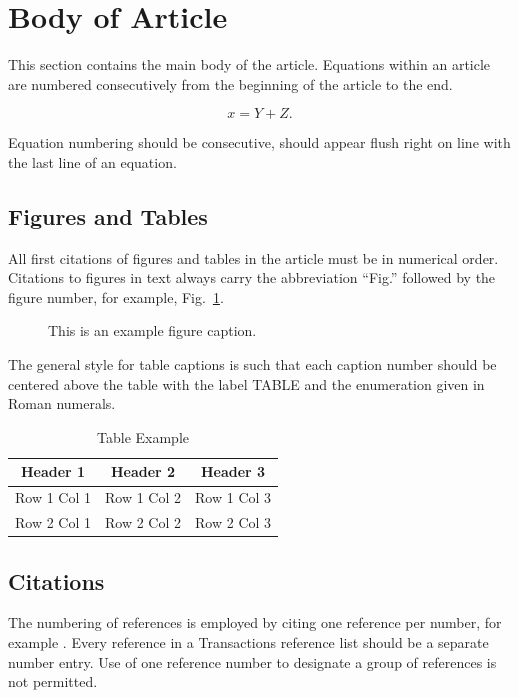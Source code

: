 \section{Body of Article}

This section contains the main body of the article. Equations within an article are numbered consecutively from the beginning of the article to the end.

\begin{equation}
    x = Y + Z. \label{eq:sample}
\end{equation}

Equation numbering should be consecutive, should appear flush right on line with the last line of an equation. 

\subsection{Figures and Tables}

All first citations of figures and tables in the article must be in numerical order. Citations to figures in text always carry the abbreviation ``Fig.'' followed by the figure number, for example, Fig.~\ref{fig:sample}.

\begin{figure}[tb]
    \centering
    \caption{This is an example figure caption.}
    \label{fig:sample}
\end{figure}

The general style for table captions is such that each caption number should be centered above the table with the label TABLE and the enumeration given in Roman numerals.

\begin{table}[H]
    \caption{Table Example}
    \begin{center}
        \begin{tabular}{|c|c|c|}
            \hline
            \textbf{Header 1} & \textbf{Header 2} & \textbf{Header 3} \\
            \hline
            Row 1 Col 1 & Row 1 Col 2 & Row 1 Col 3 \\
            \hline
            Row 2 Col 1 & Row 2 Col 2 & Row 2 Col 3 \\
            \hline
        \end{tabular}
    \end{center}
    \label{tab:sample}
\end{table}

\subsection{Citations}

The numbering of references is employed by citing one reference per number, for example \cite{sample_ref}. Every reference in a Transactions reference list should be a separate number entry. Use of one reference number to designate a group of references is not permitted.
